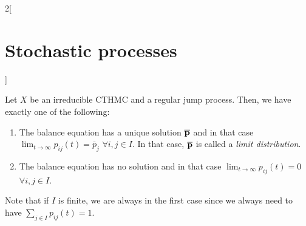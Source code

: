 \documentclass[../../../main_math.tex]{subfiles}
\begin{document}
\begin{multicols}{2}[\section{Stochastic processes}]
\begin{theorem}
    Let $X$ be an irreducible CTHMC and a regular jump process. Then, we have exactly one of the following:
    \begin{enumerate}
      \item The balance equation has a unique solution $\boldsymbol{\mathrm{\overline{p}}}$ and in that case $\displaystyle \lim_{t\to\infty}p_{ij}(t)=\overline{p}_j$ $\forall i,j\in I$. In that case, $\boldsymbol{\mathrm{\overline{p}}}$ is called a \emph{limit distribution}.
      \item The balance equation has no solution and in that case $\displaystyle \lim_{t\to\infty}p_{ij}(t)=0$ $\forall i,j\in I$.
    \end{enumerate}
  \end{theorem}
  \begin{remark}
    Note that if $I$ is finite, we are always in the first case since we always need to have $\sum_{j\in I}p_{ij}(t)=1$.
  \end{remark}

\end{multicols}
\end{document}
